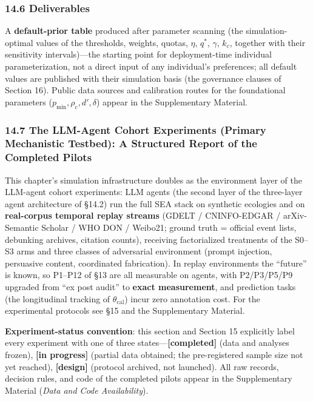 \documentclass[
  11pt]{article}
\begin{document}
\subsubsection{14.6 Deliverables}\label{deliverables}

A \textbf{default-prior table} produced after parameter scanning (the
simulation-optimal values of the thresholds, weights, quotas, \(\eta\),
\(q^*\), \(\gamma\), \(k_c\), together with their sensitivity
intervals)---the starting point for deployment-time individual
parameterization, not a direct input of any individual's preferences;
all default values are published with their simulation basis (the
governance clauses of Section 16). Public data sources and calibration
routes for the foundational parameters
(\(p_{\min}, \rho_c, d', \delta\)) appear in the Supplementary Material.

\subsubsection{14.7 The LLM-Agent Cohort Experiments (Primary
Mechanistic Testbed): A Structured Report of the Completed
Pilots}\label{the-llm-agent-cohort-experiments-primary-mechanistic-testbed-a-structured-report-of-the-completed-pilots}

This chapter's simulation infrastructure doubles as the environment
layer of the LLM-agent cohort experiments: LLM agents (the second layer
of the three-layer agent architecture of §14.2) run the full SEA stack
on synthetic ecologies and on \textbf{real-corpus temporal replay
streams} (GDELT / CNINFO-EDGAR / arXiv-Semantic Scholar / WHO DON /
Weibo21; ground truth = official event lists, debunking archives,
citation counts), receiving factorialized treatments of the S0--S3 arms
and three classes of adversarial environment (prompt injection,
persuasive content, coordinated fabrication). In replay environments the
``future'' is known, so P1--P12 of §13 are all measurable on agents,
with P2/P3/P5/P9 upgraded from ``ex post audit'' to \textbf{exact
measurement}, and prediction tasks (the longitudinal tracking of
\(\theta_{\mathrm{cal}}\)) incur zero annotation cost. For the
experimental protocols see §15 and the Supplementary Material.

\textbf{Experiment-status convention}: this section and Section 15
explicitly label every experiment with one of three
states---\textbf{{[}completed{]}} (data and analyses frozen),
\textbf{{[}in progress{]}} (partial data obtained; the pre-registered
sample size not yet reached), \textbf{{[}design{]}} (protocol archived,
not launched). All raw records, decision rules, and code of the
completed pilots appear in the Supplementary Material (\emph{Data and
Code Availability}).
\end{document}
